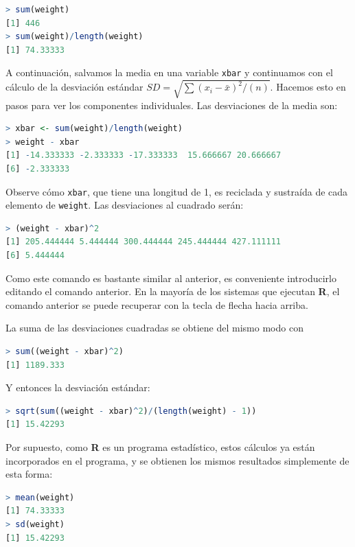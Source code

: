 \begin{lstlisting}[language=R]
> sum(weight)
[1] 446
> sum(weight)/length(weight)
[1] 74.33333
\end{lstlisting}

A continuación, salvamos la media en una variable \texttt{xbar} y continuamos
con el cálculo de la desviación estándar $SD = \sqrt{\sum (x_i -\bar{x})^2/(n)}$.
Hacemos esto en pasos para ver los componentes individuales. Las desviaciones
de la media son:

\begin{lstlisting}[language=R]
> xbar <- sum(weight)/length(weight)
> weight - xbar
[1] -14.333333 -2.333333 -17.333333  15.666667 20.666667
[6] -2.333333
\end{lstlisting}

Observe cómo \texttt{xbar}, que tiene una longitud de 1, es reciclada y
sustraída de cada elemento de \texttt{weight}. Las desviaciones al cuadrado
serán:

\begin{lstlisting}[language=R]
> (weight - xbar)^2
[1] 205.444444 5.444444 300.444444 245.444444 427.111111
[6] 5.444444
\end{lstlisting}

Como este comando es bastante similar al anterior, es conveniente introducirlo
editando el comando anterior. En la mayoría de los sistemas que ejecutan
\textbf{R}, el comando anterior se puede recuperar con la tecla de flecha hacia
arriba.

La suma de las desviaciones cuadradas se obtiene del mismo modo con

\begin{lstlisting}[language=R]
> sum((weight - xbar)^2)
[1] 1189.333
\end{lstlisting}

Y entonces la desviación estándar:

\begin{lstlisting}[language=R]
> sqrt(sum((weight - xbar)^2)/(length(weight) - 1))
[1] 15.42293
\end{lstlisting}

Por supuesto, como \textbf{R} es un programa estadístico, estos cálculos ya
están incorporados en el programa, y se obtienen los mismos resultados
simplemente de esta forma:

\begin{lstlisting}[language=R]
> mean(weight)
[1] 74.33333
> sd(weight)
[1] 15.42293
\end{lstlisting}

